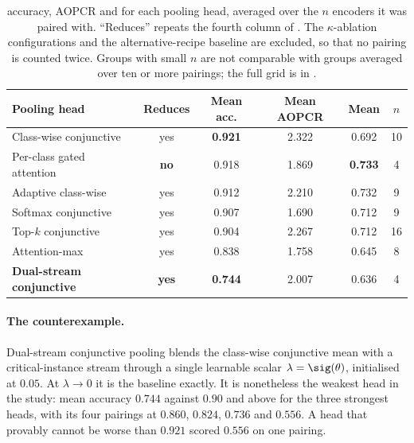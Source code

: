 \begin{table}[t]
\caption{\webtraffic{} accuracy, AOPCR and \ndcg{} for each pooling head, averaged over the $n$
encoders it was paired with. ``Reduces'' repeats the fourth column of . The
$\kappa$-ablation configurations and the alternative-recipe baseline are excluded, so that no
pairing is counted twice. Groups with small $n$ are not comparable with groups averaged over ten or
more pairings; the full grid is in .}
\label{tab:pooling}
\begin{center}
\footnotesize
\begin{tabular}{lccccc}
\toprule
\textbf{Pooling head} & \textbf{Reduces} & \textbf{Mean acc.} & \textbf{Mean AOPCR} &
\textbf{Mean \ndcg{}} & \textbf{$n$} \\
\midrule
Class-wise conjunctive      & yes & \textbf{0.921} & 2.322 & 0.692 & 10 \\
Per-class gated attention   & \textbf{no}  & 0.918 & 1.869 & \textbf{0.733} & \phantom{0}4 \\
Adaptive class-wise         & yes & 0.912 & 2.210 & 0.732 & \phantom{0}9 \\
Softmax conjunctive         & yes & 0.907 & 1.690 & 0.712 & \phantom{0}9 \\
Top-$k$ conjunctive         & yes & 0.904 & 2.267 & 0.712 & 16 \\
Attention-max               & yes & 0.838 & 1.758 & 0.645 & \phantom{0}8 \\
\textbf{Dual-stream conjunctive} & \textbf{yes} & \textbf{0.744} & 2.007 & 0.636 & \phantom{0}4 \\
\bottomrule
\end{tabular}
\end{center}
\end{table}

\paragraph{The counterexample.}
Dual-stream conjunctive pooling blends the class-wise conjunctive mean with a critical-instance
stream through a single learnable scalar $\lambda = \sig(\theta)$, initialised at $0.05$. At
$\lambda \to 0$ it is the baseline exactly. It is nonetheless the weakest head in the study: mean
accuracy $0.744$ against $0.90$ and above for the three strongest heads, with its four pairings at
$0.860$, $0.824$, $0.736$ and $0.556$. A head that provably cannot be worse than $0.921$ scored
$0.556$ on one pairing.

